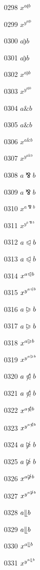 \documentclass{article}
\begin{document}
0298 $x^{a\llparenthesis b}$\par
0299 $x^{y^{a\llparenthesis b}}$\par
0300 $a\rrparenthesis b$\par
0301 $\displaystyle a\rrparenthesis b$\par
0302 $x^{a\rrparenthesis b}$\par
0303 $x^{y^{a\rrparenthesis b}}$\par
0304 $a\binampersand b$\par
0305 $\displaystyle a\binampersand b$\par
0306 $x^{a\binampersand b}$\par
0307 $x^{y^{a\binampersand b}}$\par
0308 $a\bindnasrepma b$\par
0309 $\displaystyle a\bindnasrepma b$\par
0310 $x^{a\bindnasrepma b}$\par
0311 $x^{y^{a\bindnasrepma b}}$\par
0312 $a\trianglelefteqslant b$\par
0313 $\displaystyle a\trianglelefteqslant b$\par
0314 $x^{a\trianglelefteqslant b}$\par
0315 $x^{y^{a\trianglelefteqslant b}}$\par
0316 $a\trianglerighteqslant b$\par
0317 $\displaystyle a\trianglerighteqslant b$\par
0318 $x^{a\trianglerighteqslant b}$\par
0319 $x^{y^{a\trianglerighteqslant b}}$\par
0320 $a\ntrianglelefteqslant b$\par
0321 $\displaystyle a\ntrianglelefteqslant b$\par
0322 $x^{a\ntrianglelefteqslant b}$\par
0323 $x^{y^{a\ntrianglelefteqslant b}}$\par
0324 $a\ntrianglerighteqslant b$\par
0325 $\displaystyle a\ntrianglerighteqslant b$\par
0326 $x^{a\ntrianglerighteqslant b}$\par
0327 $x^{y^{a\ntrianglerighteqslant b}}$\par
0328 $a\llfloor b$\par
0329 $\displaystyle a\llfloor b$\par
0330 $x^{a\llfloor b}$\par
0331 $x^{y^{a\llfloor b}}$\par
\end{document}

